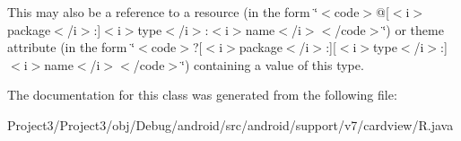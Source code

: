 This may also be a reference to a resource (in the form \char`\"{}$<$code$>$@\mbox{[}$<$i$>$package$<$/i$>$\+:\mbox{]}$<$i$>$type$<$/i$>$\+:$<$i$>$name$<$/i$>$$<$/code$>$\char`\"{}) or theme attribute (in the form \char`\"{}$<$code$>$?\mbox{[}$<$i$>$package$<$/i$>$\+:\mbox{]}\mbox{[}$<$i$>$type$<$/i$>$\+:\mbox{]}$<$i$>$name$<$/i$>$$<$/code$>$\char`\"{}) containing a value of this type. 

The documentation for this class was generated from the following file\+:\begin{DoxyCompactItemize}
\item 
Project3/\+Project3/obj/\+Debug/android/src/android/support/v7/cardview/R.\+java\end{DoxyCompactItemize}
